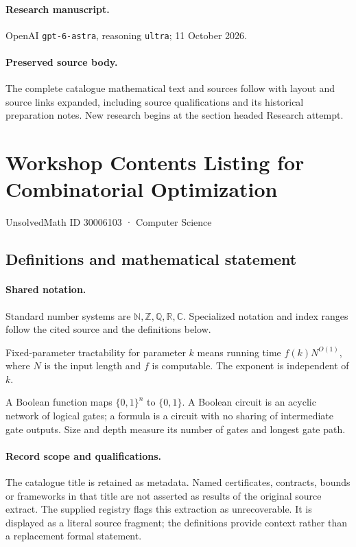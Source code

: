 \documentclass[11pt]{article}
\begin{document}
\paragraph{Research manuscript.} OpenAI \texttt{gpt-6-astra}, reasoning \texttt{ultra}; 11 October 2026.
\paragraph{Preserved source body.} The complete catalogue mathematical text and sources follow with layout and source links expanded, including source qualifications and its historical preparation notes. New research begins at the section headed Research attempt.

\section{Workshop Contents Listing for Combinatorial Optimization}\label{30006103}
{\small UnsolvedMath ID 30006103 · Computer Science}
\subsection{Definitions and mathematical statement}

\paragraph{Shared notation.}Standard number systems are $\mathbb N,\mathbb Z,\mathbb Q,\mathbb R,\mathbb C$. Specialized notation and index ranges follow the cited source and the definitions below.


Fixed-parameter tractability for parameter $k$ means running time $f(k)N^{O(1)}$, where $N$ is the input length and $f$ is computable. The exponent is independent of $k$.

A Boolean function maps $\{0,1\}^n$ to $\{0,1\}$. A Boolean circuit is an acyclic network of logical gates; a formula is a circuit with no sharing of intermediate gate outputs. Size and depth measure its number of gates and longest gate path.
\paragraph{Record scope and qualifications.}
The catalogue title is retained as metadata. Named certificates, contracts, bounds or frameworks in that title are not asserted as results of the original source extract.
The supplied registry flags this extraction as unrecoverable. It is displayed as a literal source fragment; the definitions provide context rather than a replacement formal statement.
\end{document}

